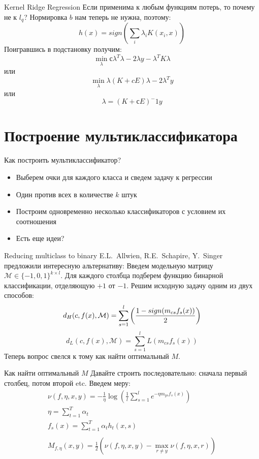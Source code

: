 \documentclass[14pt, fleqn, xcolor={dvipsnames, table}]{beamer}
\begin{document}
\begin{frame}{Kernel Ridge Regression}
\small
Если применима к любым функциям потерь, то почему не к $l_q$? Нормировка $b$ нам теперь не нужна, поэтому:
$$
h(x) = sign \left(\sum_i \lambda_i K(x_i, x)\right)
$$
Поигравшись в подстановку получим:
$$
\min_\lambda с \lambda^T\lambda - 2 \lambda y - \lambda^T K \lambda
$$
или
$$
\min_\lambda \lambda (K + cE) \lambda - 2\lambda^T y
$$
или
$$
\lambda = \left(K + с E\right)^-1y
$$
\end{frame}

\section{Построение мультиклассификатора} %
\begin{frame}{Как построить мультиклассификатор?}
\begin{itemize}
  \item Выберем очки для каждого класса и сведем задачу к регрессии
  \item Один против всех в количестве $k$ штук
  \item Построим одновременно несколько классификаторов с условием их соотношения
  \item Есть еще идеи?
\end{itemize}
\end{frame}

\begin{frame}{Reducing multiclass to binary}
E.L.~Allwien, R.E.~Schapire, Y.~Singer предложили интересную альтернативу:
Введем модельную матрицу $\mathcal{M} \in \{-1,0,1\}^{k\times l}$. Для каждого столбца подберем функцию бинарной классификации, отделяющую $+1$ от $-1$.
Решим исходную задачу одним из двух способов:
$$
d_H(c, f(x), \mathcal{M}) = \sum_{s = 1}^l\left({1 - sign(m_{cs} f_s(x)) \over 2}\right)
$$
$$
d_L(c, f(x), \mathcal{M}) = \sum_{s = 1}^l L(m_{cs} f_s(x))
$$
Теперь вопрос свелся к тому как найти оптимальный $M$.
\end{frame}

\begin{frame}{Как найти оптимальный $M$}
Давайте строить последовательно: сначала первый столбец, потом второй etc. Введем меру:
$$\begin{array}{l}
\nu(f,\eta,x,y) = -\frac{1}{\eta} \log  \left(\frac{1}{l}\sum_{s=1}^{l} e^{-\eta m_{ys} f_s(x)}\right) \\
\eta = \sum_{t=1}^T \alpha_t \\
f_s(x) = \sum_{t=1}^T \alpha_t h_t(x, s) \\
\\
M_{f,\eta}(x,y) = \frac{1}{2}\left(\nu(f,\eta, x, y) - \max_{r\ne y}\nu(f,\eta,x,r)\right)
\end{array}$$
\end{frame}
\end{document}
